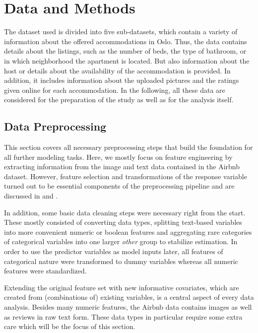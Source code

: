\section{Data and Methods}

The dataset used is divided into five sub-datasets, which contain a variety of information about the offered accommodations in Oslo. Thus, the data contains details about the listings, such as the number of beds, the type of bathroom, or in which neighborhood the apartment is located. But also information about the host or details about the availability of the accommodation is provided.
In addition, it includes information about the uploaded pictures and the ratings given online for each accommodation. In the following, all these data are considered for the preparation of the study as well as for the analysis itself.

\subsection{Data Preprocessing}

This section covers all necessary preprocessing steps that build the foundation for all further modeling tasks.
Here, we mostly focus on feature engineering by extracting information from the image and text data contained in the Airbnb dataset.
However, feature selection and transformations of the response variable turned out to be essential components of the preprocessing pipeline and are discussed in  and .

In addition, some basic data cleaning steps were necessary right from the start.
These mostly consisted of converting data types, splitting text-based variables into more convenient numeric or boolean features and aggregating rare categories of categorical variables into one larger \emph{other} group to stabilize estimation.
In order to use the predictor variables as model inputs later, all features of categorical nature were transformed to dummy variables whereas all numeric features were standardized.

Extending the original feature set with new informative covariates, which are created from (combinations of) existing variables, is a central aspect of every data analysis.
Besides many numeric features, the Airbnb data contains images as well as reviews in raw text form.
These data types in particular require some extra care which will be the focus of this section.

